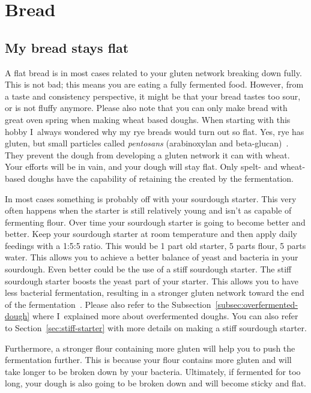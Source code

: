\section{Bread}
\subsection{My bread stays flat}

A flat bread is in most cases related to your gluten
network breaking down fully. This is not bad; this
means you are eating a fully fermented food. However,
from a taste and consistency perspective, it might be
that your bread tastes too sour, or is not fluffy anymore.
Please also note that you can only make bread with
great oven spring when making wheat based doughs. When
starting with this hobby I~always wondered why my rye
breads would turn out so flat. Yes, rye has gluten, but
small particles called \emph{pentosans} (arabinoxylan and beta-glucan)~\cite{rye-defects}.
They prevent the dough from developing a gluten network it can
with wheat. Your efforts will be in vain, and your dough will
stay flat. Only spelt- and wheat-based doughs have the capability
of retaining the  created by the fermentation.

In most cases something is probably off with your
sourdough starter. This very often happens when the starter
is still relatively young and isn't as capable of
fermenting flour. Over time your sourdough
starter is going to become better and better.
Keep your sourdough starter at room temperature
and then apply daily feedings with a 1:5:5 ratio.
This would be 1 part old starter, 5 parts flour,
5 parts water. This allows you to achieve a better
balance of yeast and bacteria in your sourdough.
Even better could be the use of a stiff sourdough
starter. The stiff sourdough starter boosts
the yeast part of your starter. This allows you
to have less bacterial fermentation, resulting
in a stronger gluten network toward the end
of the fermentation~\cite{stiff+starter}. Please
also refer to the Subsection~\ref{subsec:overfermented-dough} where
I~explained more about overfermented doughs. You can also
refer to Section~\ref{sec:stiff-starter} with more details on
making a stiff sourdough starter.

Furthermore, a stronger flour containing more gluten
will help you to push the fermentation further. This
is because your flour contains more gluten and will
take longer to be broken down by your bacteria. Ultimately,
if fermented for too long, your dough is also going
to be broken down and will become sticky and flat.

